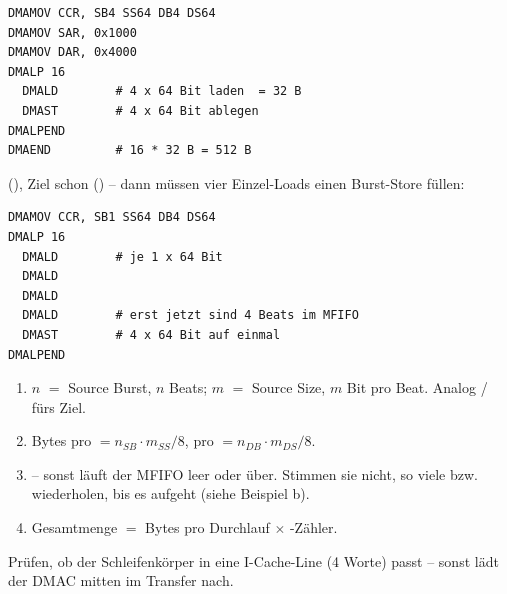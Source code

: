 \begin{bsp}
\begin{lstlisting}
DMAMOV CCR, SB4 SS64 DB4 DS64
DMAMOV SAR, 0x1000
DMAMOV DAR, 0x4000
DMALP 16
  DMALD        # 4 x 64 Bit laden  = 32 B
  DMAST        # 4 x 64 Bit ablegen
DMALPEND
DMAEND         # 16 * 32 B = 512 B
\end{lstlisting}
 (), Ziel schon () --
dann müssen vier Einzel-Loads einen Burst-Store füllen:
\begin{lstlisting}
DMAMOV CCR, SB1 SS64 DB4 DS64
DMALP 16
  DMALD        # je 1 x 64 Bit
  DMALD
  DMALD
  DMALD        # erst jetzt sind 4 Beats im MFIFO
  DMAST        # 4 x 64 Bit auf einmal
DMALPEND
\end{lstlisting}
\end{bsp}
\begin{rezept}
\label{rez:ccr}
\begin{enumerate}
\item {}$n$ $=$ Source Burst, $n$ Beats; $m$ $=$ Source Size,
      $m$ Bit pro Beat. Analog / fürs Ziel.
\item Bytes pro  $= n_{SB} \cdot m_{SS}/8$,
      pro  $= n_{DB} \cdot m_{DS}/8$.
\item {} -- sonst läuft der MFIFO
      leer oder über. Stimmen sie nicht, so viele  bzw.\
       wiederholen, bis es aufgeht (siehe Beispiel b).
\item Gesamtmenge $=$ Bytes pro Durchlauf $\times$ -Zähler.
\end{enumerate}
\merkzeile Prüfen, ob der Schleifenkörper in eine I-Cache-Line
(4 Worte) passt -- sonst lädt der DMAC mitten im Transfer nach.
\end{rezept}
